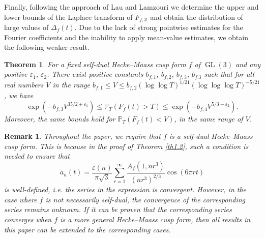 \documentclass[10pt,leqno]{amsart}
\numberwithin{equation}{section}
\newtheorem{theorem}[definition]{{Theorem}}
\newtheorem{remark}{{Remark}}
\begin{document}
Finally, following the approach of Lau \cite{MR1862056} and Lamzouri \cite{MR4041109} we determine the upper and lower bounds of the Laplace transform of $F_{f,\mathbb{X}}$ and obtain the distribution of large values of $\Delta_f(t)$. Due to the lack of strong pointwise estimates for the Fourier coefficients and the inability to apply mean-value estimates, we  obtain the following weaker result.
\begin{theorem}\label{th1.5}
     For a fixed self-dual Hecke--Maass cusp form $f$ of $\operatorname{GL}(3)$ and any positive $\varepsilon_1$, $\varepsilon_2$. There exist positive constants  $b_{f,1}$, $b_{f,2}$, $b_{f,3}$, $b_{f.3}$ such that for all  real numbers $V$ in the range $b_{f,1}\leqslant V \leqslant b_{f,2} (\log \log T)^{1/21}(\log \log \log T)^{-5/21}$, we have
    \[
    \exp(-b_{f,3}V^{35/2+\varepsilon_1})\leqslant \mathbb{P}_T(F_f(t)>T) \leqslant \exp(-b_{f,4} V^{5/3-\varepsilon_2}).
    \]
    Moreover, the same bounds hold for $\mathbb{P}_T(F_f(t)<V)$, in the same range of $V$.
\end{theorem}

\begin{remark}
Throughout the paper, we require that $f$ is a self-dual Hecke--Maass cusp form. This is because in the proof of Theorem \ref{th1.2}, such a condition is needed to ensure that
\[
a_n(t) = \frac{\varepsilon(n)}{\pi \sqrt{3}} \sum_{r=1}^{\infty} \frac{A_f(1, n r^3)}{(n r^3)^{2/3}} \cos(6\pi r t)
\] 
is well-defined, i.e. the series in the expression is convergent. However, in the case where $f$ is not necessarily self-dual, the convergence of the corresponding series remains unknown. If it can be proven that the corresponding series converges when $f$ is a more general Hecke--Maass  cusp form, then all results in this paper can be extended to the corresponding cases.
\end{remark}
\end{document}
